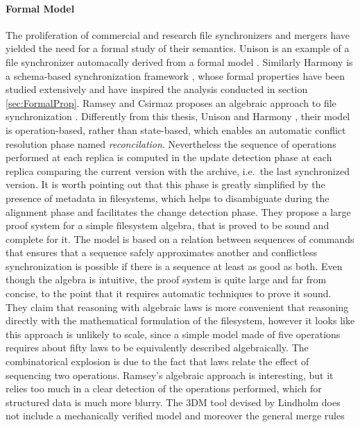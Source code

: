 \documentclass[../Thesis.tex]{subfiles}
\begin{document}
	\paragraph{Formal Model}
	The proliferation of commercial and research file synchronizers and
	mergers have yielded the need for a formal study of their semantics.
	Unison \cite{UnisonSpec} is an example of a file synchronizer 
	automacally derived	 from a formal model \cite{Pierce98}.
	Similarly Harmony is a schema-based
	synchronization framework \cite{HarmonyOverview}, whose formal
	properties have been studied extensively \cite{Pierce07} and have
	inspired the analysis conducted in section \ref{sec:FormalProp}.
	Ramsey and Csirmaz proposes an algebraic approach to 
	file synchronization \cite{Ramsey01}. 
	Differently from this thesis, Unison \cite{Pierce98} and Harmony 
	\cite{Pierce07}, their model is operation-based, rather than state-based,
	which enables an automatic conflict resolution phase named 
	\emph{reconcilation}.
	Nevertheless the sequence of operations performed at each replica
	is computed in the update detection phase at each replica 
	comparing the current version with the archive, i.e.\ the last synchronized 
	version. 
	It is worth pointing out that this phase is greatly simplified by the presence
	of metadata in filesystems, which helps to disambiguate during 
	the alignment phase and facilitates the change detection phase.
	They propose a large proof system 	for a simple filesystem algebra, that
	is proved to be sound and complete for it.
	The model is based on a relation between sequences
	of commands that ensures that a sequence safely approximates another
	and conflictless synchronization is possible if there is a sequence
	at least as good as both.
	Even though the algebra is intuitive, the proof system is quite large and
	far from concise, to the point that it requires automatic techniques to
	prove it sound.
	They claim that reasoning with algebraic laws is more convenient that 
	reasoning directly with the mathematical formulation of the filesystem, 
	however it looks like this approach is unlikely to scale, since 
	a simple model made of five operations requires about fifty laws to
	be equivalently described algebraically.
	The combinatorical explosion is due to the fact that laws relate
	the effect of sequencing two operations. 	
	Ramsey's algebraic approach is interesting, but
	it relies too much in a clear detection of the operations performed, which 
	for structured data is much more blurry. 
	The 3DM tool devised by Lindholm does not include a 
	mechanically verified model and moreover the general merge rules 
\end{document}
